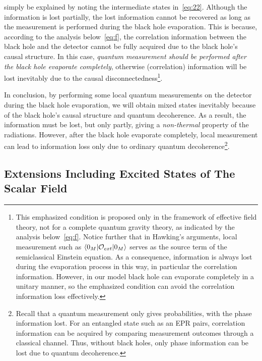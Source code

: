 \documentclass[12pt,a4paper]{article}
\begin{document}
simply be explained by noting the intermediate states in~\eqref{eq:22}. Although the information is lost partially, the lost information cannot be recovered as long as the measurement is performed during the black hole evaporation. This is because, according to the analysis below~\eqref{eq:f}, the correlation information between the black hole and the detector cannot be fully acquired due to the black hole's causal structure. In this case, \emph{quantum measurement should be performed after the black hole evaporate completely}, otherwise (correlation) information will be lost inevitably due to the causal disconnectedness\footnote{This emphasized condition is proposed only in the framework of effective field theory, not for a complete quantum gravity theory, as indicated by the analysis below~\eqref{eq:f}. Notice further that in Hawking's arguments, local measurement such as $\langle0_M\arrowvert\mathcal {O}_{ext}\arrowvert0_M\rangle$ serves as the source term of the semiclassical Einstein equation. As a consequence, information is always lost during the evaporation process in this way, in particular the correlation information. However, in our model black hole can evaporate completely in a unitary manner, so the emphasized condition can avoid the correlation information loss effectively. }.

In conclusion, by performing some local quantum
measurements on the detector during the black hole evaporation, we will obtain mixed states
inevitably because of the black hole's causal structure and quantum decoherence. As a result, the
information must be lost, but only partly, giving a
\emph{non-thermal} property of the radiations. However, after the black hole evaporate completely, local measurement can lead to information loss only due to ordinary quantum decoherence\footnote{Recall that a quantum measurement only gives probabilities, with the phase information lost. For an entangled state such as an EPR pairs, correlation information can be acquired by comparing measurement outcomes through a classical channel. Thus, without black holes, only phase information can be lost due to quantum decoherence.}.


\subsection{Extensions Including Excited States of The Scalar Field}
\label{sec:ext}
\end{document}
